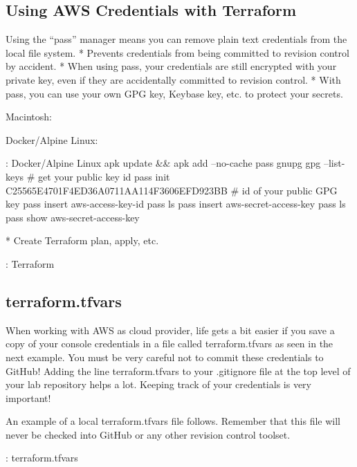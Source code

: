 \subsection{Using AWS Credentials with Terraform}
\justify{}
 Using the ``pass'' manager means you can remove plain text credentials
  from the local file system.
  * Prevents credentials from being committed to revision control by accident.
  * When using pass, your credentials are still encrypted with your private key, even
    if they are accidentally committed to revision control.
  * With pass, you can use your own GPG key, Keybase key, etc. to protect
    your secrets.

Macintosh:



Docker/Alpine Linux:

\begin{mybox}{\thetcbcounter: Docker/Alpine Linux}
apk update && apk add --no-cache pass gnupg
gpg --list-keys # get your public key id
pass init C25565E4701F4ED36A0711AA114F3606EFD923BB # id of your public GPG key
pass insert aws-access-key-id
pass ls
pass insert aws-secret-access-key
pass ls
pass show aws-secret-access-key
\end{mybox}

* Create Terraform plan, apply, etc.

\begin{mybox}{\thetcbcounter: Terraform}
  
\end{mybox}

\subsection{terraform.tfvars}
\justify{}
When working with AWS as cloud provider, life gets a bit easier if you
save a copy of your console credentials in a file called
terraform.tfvars as seen in the next example. You must be very careful
not to commit these credentials to GitHub! Adding the line
terraform.tfvars to your .gitignore file at the top level of your lab
repository helps a lot. Keeping track of your credentials is very
important!

\justify{}
An example of a local terraform.tfvars file follows. Remember that this
file will never be checked into GitHub or any other revision control
toolset.

\begin{mybox}{\thetcbcounter: terraform.tfvars}
  
\end{mybox}

